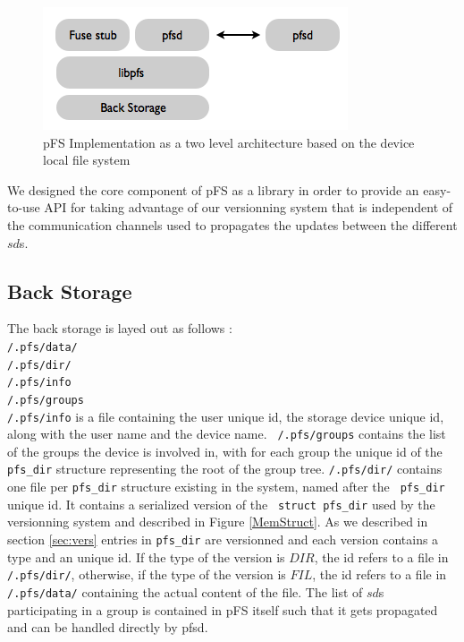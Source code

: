 \begin{figure}[ht]
\begin{center}
  \includegraphics [scale=0.6] {img/impl}
  \caption{\label{PfsImpl} {\small pFS Implementation as a two level
      architecture based on the device local file system}}
\end{center}
\end{figure}

We designed the core component of pFS as a library in order to provide
an easy-to-use API for taking advantage of our versionning system that
is independent of the communication channels used to propagates the
updates between the different $sd$s.

\subsection {Back Storage}

The back storage is layed out as follows : \\ {\tt /.pfs/data/}
\\ {\tt /.pfs/dir/} \\ {\tt /.pfs/info} \\ {\tt /.pfs/groups} \\

{\tt /.pfs/info} is a file containing the user unique id, the storage
device unique id, along with the user name and the device name. {\tt
  /.pfs/groups} contains the list of the groups the device is involved
in, with for each group the unique id of the {\tt pfs\_dir} structure
representing the root of the group tree. {\tt /.pfs/dir/} contains one
file per {\tt pfs\_dir} structure existing in the system, named after the {\tt
  pfs\_dir} unique id. It contains a serialized version of the {\tt
  struct pfs\_dir} used by the versionning system and described in
Figure \ref{MemStruct}. As we described in section \ref{sec:vers}
entries in {\tt pfs\_dir} are versionned and each version contains
a type and an unique id. If the type of the version is
$DIR$, the id refers to a file in {\tt /.pfs/dir/}, otherwise, if the
type of the version is $FIL$, the id refers to a file in {\tt
  /.pfs/data/} containing the actual content of the file. The list of
$sd$s participating in a group is contained in pFS itself such that it
gets propagated and can be handled directly by pfsd.

